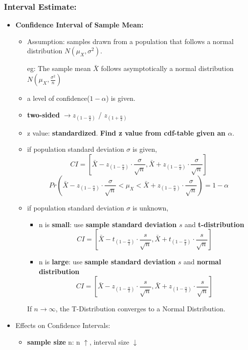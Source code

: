 \subsubsection{Interval Estimate: }
\begin{itemize}
	\item \textbf{Confidence Interval of Sample Mean:}
	\begin{itemize}
		\item Assumption: samples drawn from a population that follows a normal distribution $N(\mu_X, \sigma^2)$. 
		
		eg: The sample mean $\bar{X}$ follows asymptotically a normal distribution $N(\mu_X, \frac{\sigma^2}{n})$
		\item a level of confidence($1 - \alpha$) is given.
		\item \textbf{two-sided} $\rightarrow z_{(1 - \frac{\alpha}{2})} $  / $z_{(1 + \frac{\alpha}{2})}$
		\item z value: \textbf{standardized}. \textbf{Find z value from cdf-table given an $\alpha$}.
		\item if population standard deviation $\sigma$ is given, 
		$$CI = \left[ \bar{X} - z_{(1 - \frac{\alpha}{2})}\cdot \frac{\sigma}{\sqrt{n}} , \bar{X} + z_{(1 - \frac{\alpha}{2})}\cdot \frac{\sigma}{\sqrt{n}} \right] $$
		$$Pr(\bar{X} - z_{(1 - \frac{\alpha}{2})}\cdot \frac{\sigma}{\sqrt{n}} < \mu_X < \bar{X} + z_{(1 - \frac{\alpha}{2})}\cdot \frac{\sigma}{\sqrt{n}} ) = 1 - \alpha$$
		
		\item if population standard deviation $\sigma$ is unknown, 
		\begin{itemize}
			\item n is \textbf{small}: use \textbf{sample standard deviation $s$} and \textbf{t-distribution}
			$$CI = \left[ \bar{X} - t_{(1 - \frac{\alpha}{2})}\cdot \frac{s}{\sqrt{n}} , \bar{X} + t_{(1 - \frac{\alpha}{2})}\cdot \frac{s}{\sqrt{n}} \right] $$
			\item n is \textbf{large}: use \textbf{sample standard deviation $s$} and \textbf{normal distribution}
			$$CI = \left[ \bar{X} - z_{(1 - \frac{\alpha}{2})}\cdot \frac{s}{\sqrt{n}} , \bar{X} + z_{(1 - \frac{\alpha}{2})}\cdot \frac{s}{\sqrt{n}} \right] $$
		\end{itemize}
		If $n \rightarrow \infty$, the T-Distribution converges to a Normal Distribution.
		
	\end{itemize}

	\item Effects on Confidence Intervals:
	\begin{itemize}
		\item \textbf{sample size} n: n $\uparrow$, interval size $\downarrow$ 
		

\end{itemize}
\end{itemize}
